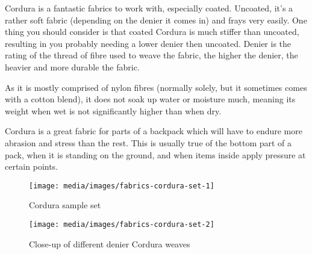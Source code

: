 Cordura is a fantastic fabrics to work with, especially coated. Uncoated, it's a rather soft fabric (depending on the denier it comes in) and frays very easily. One thing you should consider is that coated Cordura is much stiffer than uncoated, resulting in you probably needing a lower denier then uncoated. Denier is the rating of the thread of fibre used to weave the fabric, the higher the denier, the heavier and more durable the fabric.

As it is mostly comprised of nylon fibres (normally solely, but it sometimes comes with a cotton blend), it does not soak up water or moisture much, meaning its weight when wet is not significantly higher than when dry.

Cordura is a great fabric for parts of a backpack which will have to endure more abrasion and stress than the rest. This is usually true of the bottom part of a pack, when it is standing on the ground, and when items inside apply pressure at certain points.

\begin{figure}[H]
  \texttt{[image: media/images/fabrics-cordura-set-1]}
  \caption{Cordura sample set}
  \label{img:fabrics-cordura-set-1}
\end{figure}

\begin{figure}[H]
  \texttt{[image: media/images/fabrics-cordura-set-2]}
  \caption{Close-up of different denier Cordura weaves}
  \label{img:fabrics-cordura-set-2}
\end{figure}

